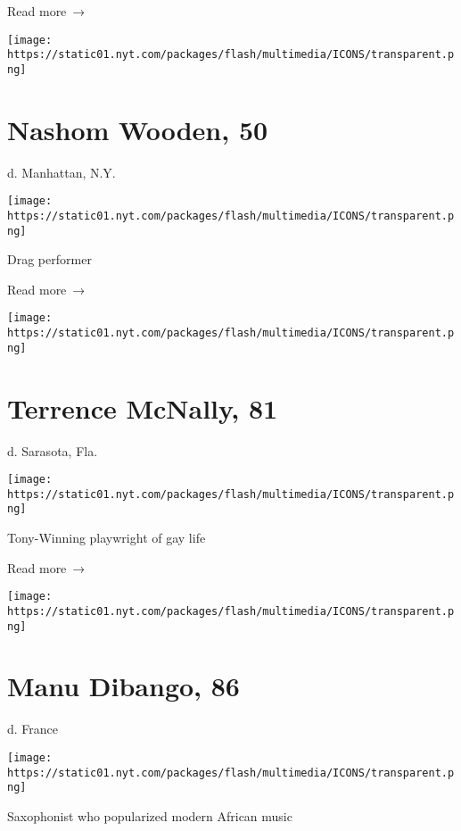  Read more~→

\href{https://www.nytimes.com/2020/03/24/style/nashom-wooden-mona-foot-death-coronavirus.html}{}

\texttt{[image: https://static01.nyt.com/packages/flash/multimedia/ICONS/transparent.png]}

\hypertarget{nashom-wooden-50}{%
\section{Nashom Wooden, 50}\label{nashom-wooden-50}}

d. Manhattan, N.Y.

\texttt{[image: https://static01.nyt.com/packages/flash/multimedia/ICONS/transparent.png]}

Drag performer

 Read more~→

\href{https://www.nytimes.com/2020/03/24/theater/terrence-mcnally-dead-coronavirus.html}{}

\texttt{[image: https://static01.nyt.com/packages/flash/multimedia/ICONS/transparent.png]}

\hypertarget{terrence-mcnally-81}{%
\section{Terrence McNally, 81}\label{terrence-mcnally-81}}

d. Sarasota, Fla.

\texttt{[image: https://static01.nyt.com/packages/flash/multimedia/ICONS/transparent.png]}

Tony-Winning playwright of gay life

 Read more~→

\href{https://www.nytimes.com/2020/03/24/arts/music/manu-dibango-dead-coronavirus.html}{}

\texttt{[image: https://static01.nyt.com/packages/flash/multimedia/ICONS/transparent.png]}

\hypertarget{manu-dibango-86}{%
\section{Manu Dibango, 86}\label{manu-dibango-86}}

d. France

\texttt{[image: https://static01.nyt.com/packages/flash/multimedia/ICONS/transparent.png]}

Saxophonist who popularized modern African music

